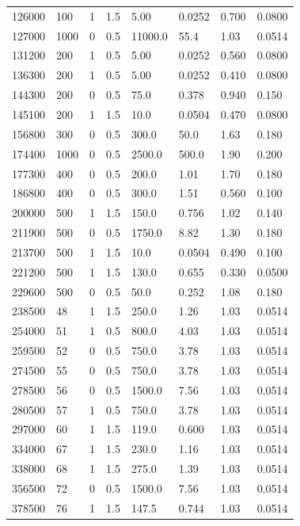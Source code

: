\documentclass[preview]{standalone}
\begin{document}
{{\begin{tabular}{L{1.2cm}C{1.2cm} C{0.3cm}C{0.5cm} C{1.4cm}C{1.4cm} C{1.4cm}C{1.4cm}}
  126000  &   100  & 1     & 1.5 &  5.00  & 0.0252  & 0.700 &  0.0800   \\ 
  127000  &  1000  & 0     & 0.5 &  11000.0  & 55.4  & 1.03 &  0.0514   \\ 
  131200  &   200  & 1     & 0.5 &  5.00  & 0.0252  & 0.560 &  0.0800   \\ 
  136300  &   200  & 1     & 0.5 &  5.00  & 0.0252  & 0.410 &  0.0800   \\ 
  144300  &   200  & 0     & 0.5 &  75.0  & 0.378  & 0.940 &  0.150   \\ 
  145100  &   200  & 1     & 1.5 &  10.0  & 0.0504  & 0.470 &  0.0800   \\ 
  156800  &   300  & 0     & 0.5 &  300.0  & 50.0  & 1.63 &  0.180   \\ 
  174400  &  1000  & 0     & 0.5 &  2500.0  & 500.0  & 1.90 &  0.200   \\ 
  177300  &   400  & 0     & 0.5 &  200.0  & 1.01  & 1.70 &  0.180   \\ 
  186800  &   400  & 0     & 0.5 &  300.0  & 1.51  & 0.560 &  0.100   \\ 
  200000  &   500  & 1     & 1.5 &  150.0  & 0.756  & 1.02 &  0.140   \\ 
  211900  &   500  & 0     & 0.5 &  1750.0  & 8.82  & 1.30 &  0.180   \\ 
  213700  &   500  & 1     & 1.5 &  10.0  & 0.0504  & 0.490 &  0.100   \\ 
  221200  &   500  & 1     & 1.5 &  130.0  & 0.655  & 0.330 &  0.0500   \\ 
  229600  &   500  & 0     & 0.5 &  50.0  & 0.252  & 1.08 &  0.180   \\ 
  238500  &    48  & 1     & 1.5 &  250.0  & 1.26  & 1.03 &  0.0514   \\ 
  254000  &    51  & 1     & 0.5 &  800.0  & 4.03  & 1.03 &  0.0514   \\ 
  259500  &    52  & 0     & 0.5 &  750.0  & 3.78  & 1.03 &  0.0514   \\ 
  274500  &    55  & 0     & 0.5 &  750.0  & 3.78  & 1.03 &  0.0514   \\ 
  278500  &    56  & 0     & 0.5 &  1500.0  & 7.56  & 1.03 &  0.0514   \\ 
  280500  &    57  & 1     & 0.5 &  750.0  & 3.78  & 1.03 &  0.0514   \\ 
  297000  &    60  & 1     & 1.5 &  119.0  & 0.600  & 1.03 &  0.0514   \\ 
  334000  &    67  & 1     & 1.5 &  230.0  & 1.16  & 1.03 &  0.0514   \\ 
  338000  &    68  & 1     & 1.5 &  275.0  & 1.39  & 1.03 &  0.0514   \\ 
  356500  &    72  & 0     & 0.5 &  1500.0  & 7.56  & 1.03 &  0.0514   \\ 
  378500  &    76  & 1     & 1.5 &  147.5  & 0.744  & 1.03 &  0.0514   \\ 
\hline 
\end{tabular} 

}}
\end{document}
